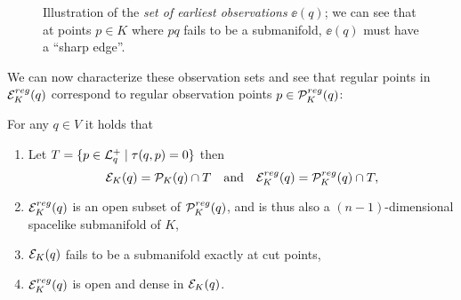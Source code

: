 \begin{figure}
    \centering
    
    \caption{
        Illustration of the \emph{set of earliest observations} $\ee(q)$; we can see that at points $p\in K$ where $pq$ fails to be a submanifold, $\ee(q)$ must have a \enquote{sharp edge}.
    }
    \label{fig:EKDef}
\end{figure}

We can now characterize these observation sets and see that regular points in ${{\mathcal{E}}^{reg}_K}(q)$ correspond to regular observation points $p\in {\mathcal{P}}^{reg}_K(q)$:
\begin{proposition}\label{prop:submanifolds}
For any $q\in V$ it holds that
\begin{enumerate}[label={\textnormal{(\arabic*)}}]
    \item Let $T=\{p\in {\mathcal{L}}^+_q \mid \tau(q,p)=0\}$ then 
    \[
        {\mathcal{E}}_K(q) = {\mathcal{P}}_K(q) \cap T \quad \text{and} \quad {\mathcal{E}}^{reg}_K(q) = {\mathcal{P}}^{reg}_K(q) \cap T,
    \]
    \item  ${\mathcal{E}}^{reg}_K(q)$ is an open subset of ${\mathcal{P}}^{reg}_K(q)$, and is thus also a $(n-1)$-dimensional spacelike submanifold of $K$,
    \item ${\mathcal{E}}_K(q)$ fails to be a submanifold exactly at cut points,
    \item ${\mathcal{E}}^{reg}_K(q)$ is open and dense in ${\mathcal{E}}_K(q)$.
\end{enumerate}
\end{proposition}
